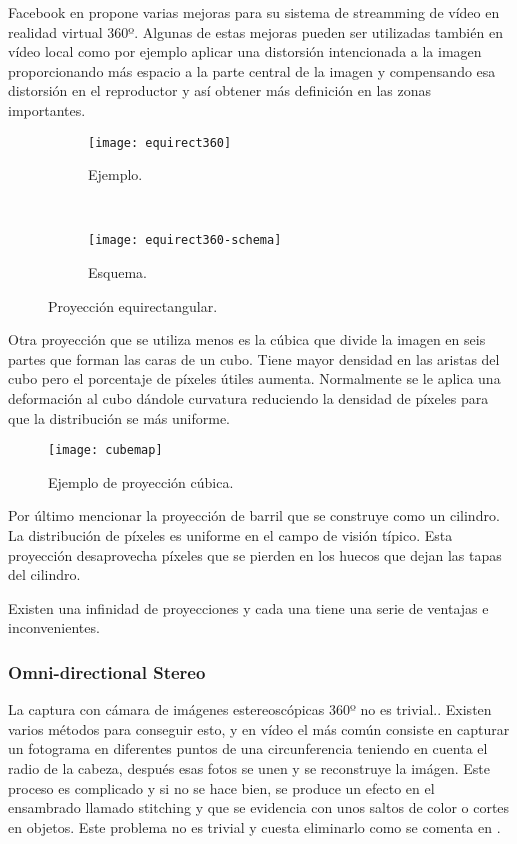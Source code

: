Facebook en \cite{FBDynamicStreamming}  propone varias mejoras para su sistema de streamming de vídeo en realidad virtual 360º. Algunas de estas mejoras pueden ser utilizadas también en vídeo local como por ejemplo aplicar una distorsión intencionada a la imagen proporcionando más espacio a la parte central de la imagen y compensando esa distorsión en el reproductor y así obtener más definición en las zonas importantes.

\begin{figure}[h]
\centering
\begin{subfigure}{.8\linewidth}
	\centering
  \texttt{[image: equirect360]}
  \caption{Ejemplo.}
  \label{fig:equirect360-example}
\end{subfigure}\\
\begin{subfigure}{.8\linewidth}
	\centering
  \texttt{[image: equirect360-schema]}
  \caption{Esquema.}
  \label{fig:equirect360-schema}
\end{subfigure}
\caption{Proyección equirectangular.}
\end{figure}

Otra proyección que se utiliza menos es la cúbica que divide la imagen en seis partes que forman las caras de un cubo. Tiene mayor densidad en las aristas del cubo pero el porcentaje de píxeles útiles aumenta. Normalmente se le aplica una deformación al cubo dándole curvatura reduciendo la densidad de píxeles para que la distribución se más uniforme.

\begin{figure}[h]
  \centering
  \texttt{[image: cubemap]}
  \caption{Ejemplo de proyección cúbica.}
  \label{fig:cubemap-example}
\end{figure}

Por último mencionar la proyección de barril que se construye como un cilindro. La distribución de píxeles es uniforme en el campo de visión típico. Esta proyección desaprovecha píxeles que se pierden en los huecos que dejan las tapas del cilindro.

Existen una infinidad de proyecciones y cada una tiene una serie de ventajas e inconvenientes.
 
\subsubsection{Omni-directional Stereo}
La captura con cámara de imágenes estereoscópicas 360º no es trivial.. Existen varios métodos para conseguir esto, y en vídeo el más común consiste en capturar un fotograma en diferentes puntos de una circunferencia teniendo en cuenta el radio de la cabeza, después esas fotos se unen y se reconstruye la imágen. Este proceso es complicado y si no se hace bien, se produce un efecto en el ensambrado llamado stitching y que se evidencia con unos saltos de color o cortes en objetos. Este problema no es trivial y cuesta eliminarlo como se comenta en \cite{DiegoBezStitching}.

